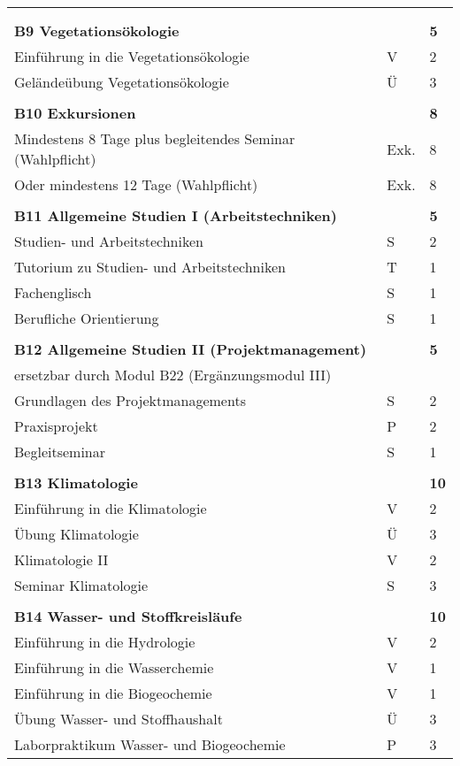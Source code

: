 \begin{longtable}{p{} p{} p{}}
&&\\
&&\\
\textbf{B9 Vegetationsökologie} & & \textbf{5}\\
Einführung in die Vegetationsökologie & V & 2 \\
Geländeübung Vegetationsökologie & Ü & 3\\
&&\\
\textbf{B10 Exkursionen}&&\textbf{8}\\
Mindestens 8 Tage plus begleitendes Seminar (Wahlpflicht) & Exk. & 8\\
Oder mindestens 12 Tage (Wahlpflicht) & Exk. & 8\\
&&\\
\textbf{B11 Allgemeine Studien I (Arbeitstechniken)}& & \textbf{5}\\
Studien- und Arbeitstechniken & S & 2\\
Tutorium zu Studien- und Arbeitstechniken & T & 1\\
Fachenglisch & S & 1\\
Berufliche Orientierung & S & 1\\
&&\\
\textbf{B12 Allgemeine Studien II (Projektmanagement)}&& \textbf{5}\\
ersetzbar durch Modul B22 (Ergänzungsmodul III)\\ 
Grundlagen des Projektmanagements & S & 2\\
Praxisprojekt & P & 2\\
Begleitseminar & S & 1 \\
&&\\
\textbf{B13 Klimatologie} && \textbf{10}\\
Einführung in die Klimatologie & V & 2\\
Übung Klimatologie & Ü & 3\\
Klimatologie II & V & 2 \\
Seminar Klimatologie & S & 3 \\
&&\\
\textbf{B14 Wasser- und Stoffkreisläufe } && \textbf{10}\\
Einführung in die Hydrologie & V & 2\\
Einführung in die Wasserchemie &V&1\\
Einführung in die Biogeochemie & V & 1 \\
Übung Wasser- und Stoffhaushalt & Ü & 3 \\
Laborpraktikum Wasser- und Biogeochemie & P & 3 \\


\end{longtable}
